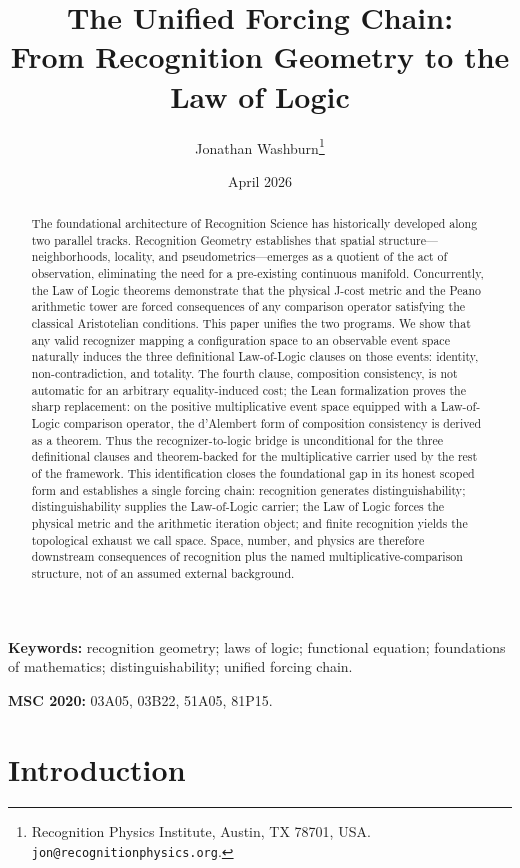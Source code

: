 \documentclass[11pt,a4paper]{article}
\title{The Unified Forcing Chain:\\
From Recognition Geometry to the Law of Logic}
\author{Jonathan Washburn\thanks{Recognition Physics Institute, Austin, TX 78701, USA. \texttt{jon@recognitionphysics.org}.}}
\date{April 2026}
\theoremstyle{definition}
\theoremstyle{remark}
\begin{document}
\maketitle

\begin{abstract}
The foundational architecture of Recognition Science has historically developed along two parallel tracks. Recognition Geometry establishes that spatial structure---neighborhoods, locality, and pseudometrics---emerges as a quotient of the act of observation, eliminating the need for a pre-existing continuous manifold. Concurrently, the Law of Logic theorems demonstrate that the physical J-cost metric and the Peano arithmetic tower are forced consequences of any comparison operator satisfying the classical Aristotelian conditions. This paper unifies the two programs. We show that any valid recognizer mapping a configuration space to an observable event space naturally induces the three definitional Law-of-Logic clauses on those events: identity, non-contradiction, and totality. The fourth clause, composition consistency, is not automatic for an arbitrary equality-induced cost; the Lean formalization proves the sharp replacement: on the positive multiplicative event space equipped with a Law-of-Logic comparison operator, the d'Alembert form of composition consistency is derived as a theorem. Thus the recognizer-to-logic bridge is unconditional for the three definitional clauses and theorem-backed for the multiplicative carrier used by the rest of the framework. This identification closes the foundational gap in its honest scoped form and establishes a single forcing chain: recognition generates distinguishability; distinguishability supplies the Law-of-Logic carrier; the Law of Logic forces the physical metric and the arithmetic iteration object; and finite recognition yields the topological exhaust we call space. Space, number, and physics are therefore downstream consequences of recognition plus the named multiplicative-comparison structure, not of an assumed external background.
\end{abstract}

\noindent\textbf{Keywords:} recognition geometry; laws of logic; functional equation; foundations of mathematics; distinguishability; unified forcing chain.

\medskip

\noindent\textbf{MSC 2020:} 03A05, 03B22, 51A05, 81P15.

\section{Introduction}
\end{document}
